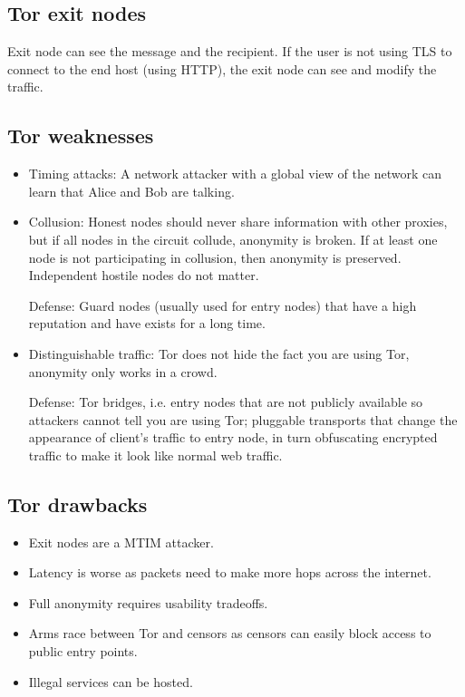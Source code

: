 \subsection{Tor exit nodes}
Exit node can see the message and the recipient. If the user is not using TLS to connect to the end host (using HTTP), the exit node can see and modify the traffic.

\subsection{Tor weaknesses}
\begin{itemize}
    \item Timing attacks: A network attacker with a global view of the network can learn that Alice and Bob are talking.
    
    \item Collusion: Honest nodes should never share information with other proxies, but if all nodes in the circuit collude, anonymity is broken. If at least one node is not participating in collusion, then anonymity is preserved. Independent hostile nodes do not matter.

    Defense: Guard nodes (usually used for entry nodes) that have a high reputation and have exists for a long time.

    \item Distinguishable traffic: Tor does not hide the fact you are using Tor, anonymity only works in a crowd.

    Defense: Tor bridges, i.e. entry nodes that are not publicly available so attackers cannot tell you are using Tor; pluggable transports that change the appearance of client's traffic to entry node, in turn obfuscating encrypted traffic to make it look  like normal web traffic.
\end{itemize}

\subsection{Tor drawbacks}
\begin{itemize}
    \item Exit nodes are a MTIM attacker.
    \item Latency is worse as packets need to make more hops across the internet.
    \item Full anonymity requires usability tradeoffs.
    \item Arms race between Tor and censors as censors can easily block access to public entry points.
    \item Illegal services can be hosted.
\end{itemize}